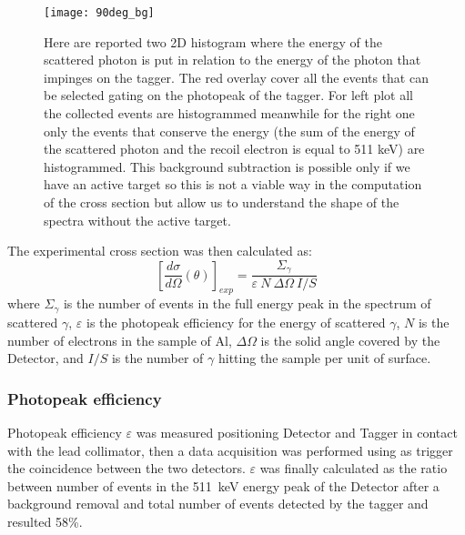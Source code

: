 \begin{figure}[H]
\centering
\texttt{[image: 90deg\_bg]}
\caption{Here are reported two 2D histogram where the energy of the scattered photon is put in relation to the energy of the photon that impinges on the tagger. The red overlay cover all the events that can be selected gating on the photopeak of the tagger. For left plot all the collected events are histogrammed meanwhile for the right one only the events that conserve the energy (the sum of the energy of the scattered photon and the recoil electron is equal to 511 keV) are histogrammed. This background subtraction is possible only if we have an active target so this is not a viable way in the computation of the cross section but allow us to understand the shape of the spectra without the active target.}
\end{figure}



The experimental cross section was then calculated as:
\begin{equation*}
	\left[\frac{d\sigma}{d\Omega}(\theta)\right]_{exp}=\frac{\Sigma_\gamma}{\varepsilon\ N\ \Delta\Omega\ I/S}
\end{equation*}
 where $\Sigma_\gamma$ is the number of events in the full energy peak in the spectrum of scattered $\gamma$, $\varepsilon$ is the photopeak efficiency for the energy of scattered  $\gamma$, $N$ is the number of electrons in the sample of Al, $\Delta\Omega$ is the solid angle covered by the Detector, and $I/S$ is the number of $\gamma$ hitting the sample per unit of surface. 
 
 
\subsubsection*{Photopeak efficiency}
Photopeak efficiency $\varepsilon$ was measured positioning Detector and Tagger in contact with the lead collimator, then a data acquisition was performed using as trigger the coincidence between the two detectors.
 $\varepsilon$ was finally calculated as the ratio between number of events in the 511~keV energy peak of the Detector after a background removal and total number of events detected by the tagger and resulted 58\%.
